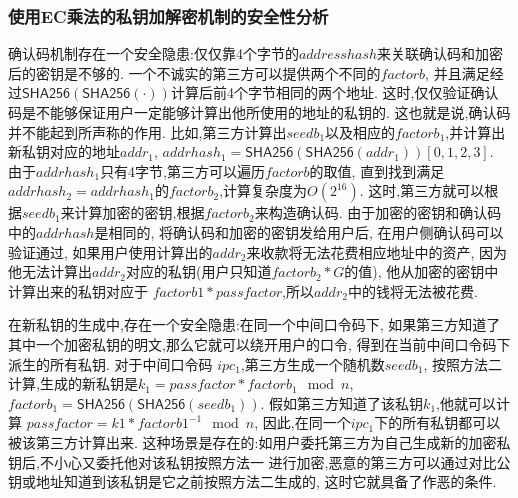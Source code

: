 \subsubsection{使用EC乘法的私钥加解密机制的安全性分析}

确认码机制存在一个安全隐患:仅仅靠4个字节的$addresshash$来关联确认码和加密后的密钥是不够的.
一个不诚实的第三方可以提供两个不同的$factorb$,
并且满足经过$\textsf{SHA256}(\textsf{SHA256}(\cdot))$计算后前4个字节相同的两个地址.
这时,仅仅验证确认码是不能够保证用户一定能够计算出他所使用的地址的私钥的.
这也就是说,确认码并不能起到所声称的作用.
比如,第三方计算出$seedb_1$以及相应的$factorb_1$,并计算出新私钥对应的地址$addr_1$, 
$addrhash_1=\textsf{SHA256}(\textsf{SHA256}(addr_1))[0,1,2,3]$.
由于$addrhash_1$只有4字节,第三方可以遍历$factorb$的取值,
直到找到满足$addrhash_2=addrhash_1$的$factorb_2$,计算复杂度为$O(2^{16})$.
这时,第三方就可以根据$seedb_1$来计算加密的密钥,根据$factorb_2$来构造确认码.
由于加密的密钥和确认码中的$addrhash$是相同的,
将确认码和加密的密钥发给用户后, 在用户侧确认码可以验证通过,
如果用户使用计算出的$addr_2$来收款将无法花费相应地址中的资产,
因为他无法计算出$addr_2$对应的私钥(用户只知道$factorb_2*G$的值),
他从加密的密钥中计算出来的私钥对应于 $factorb1 * passfactor$,所以$addr_2$中的钱将无法被花费.

在新私钥的生成中,存在一个安全隐患:在同一个中间口令码下,
如果第三方知道了其中一个加密私钥的明文,那么它就可以绕开用户的口令,
得到在当前中间口令码下派生的所有私钥.
 对于中间口令码 $ipc_1$,第三方生成一个随机数$seedb_1$,
 按照方法二计算,生成的新私钥是$k_1=passfactor * factorb_1 \mod n$, 
 $factorb_1=\textsf{SHA256}(\textsf{SHA256}(seedb_1))$. 
 假如第三方知道了该私钥$k_1$,他就可以计算 $passfactor=k1 * factorb1^{-1} \mod n$, 
 因此,在同一个$ipc_1$下的所有私钥都可以被该第三方计算出来.  
这种场景是存在的:如用户委托第三方为自己生成新的加密私钥后,不小心又委托他对该私钥按照方法一
进行加密,恶意的第三方可以通过对比公钥或地址知道到该私钥是它之前按照方法二生成的,
这时它就具备了作恶的条件.



